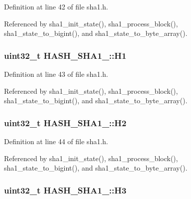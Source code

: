 Definition at line 42 of file sha1.\-h.



Referenced by sha1\-\_\-init\-\_\-state(), sha1\-\_\-process\-\_\-block(), sha1\-\_\-state\-\_\-to\-\_\-bigint(), and sha1\-\_\-state\-\_\-to\-\_\-byte\-\_\-array().

\hypertarget{structHASH__SHA1___a2545254302e2eb1e28e94f43cee5ac98}{
\subsubsection[{H1}]{\setlength{\rightskip}{0pt plus 5cm}uint32\-\_\-t H\-A\-S\-H\-\_\-\-S\-H\-A1\-\_\-\-::\-H1}}\label{structHASH__SHA1___a2545254302e2eb1e28e94f43cee5ac98}


Definition at line 43 of file sha1.\-h.



Referenced by sha1\-\_\-init\-\_\-state(), sha1\-\_\-process\-\_\-block(), sha1\-\_\-state\-\_\-to\-\_\-bigint(), and sha1\-\_\-state\-\_\-to\-\_\-byte\-\_\-array().

\hypertarget{structHASH__SHA1___a889fdb5090b3b3d0a823f4f951e32b6c}{
\subsubsection[{H2}]{\setlength{\rightskip}{0pt plus 5cm}uint32\-\_\-t H\-A\-S\-H\-\_\-\-S\-H\-A1\-\_\-\-::\-H2}}\label{structHASH__SHA1___a889fdb5090b3b3d0a823f4f951e32b6c}


Definition at line 44 of file sha1.\-h.



Referenced by sha1\-\_\-init\-\_\-state(), sha1\-\_\-process\-\_\-block(), sha1\-\_\-state\-\_\-to\-\_\-bigint(), and sha1\-\_\-state\-\_\-to\-\_\-byte\-\_\-array().

\hypertarget{structHASH__SHA1___a453afc35ccc047109080a44ba41d1a66}{
\subsubsection[{H3}]{\setlength{\rightskip}{0pt plus 5cm}uint32\-\_\-t H\-A\-S\-H\-\_\-\-S\-H\-A1\-\_\-\-::\-H3}}\label{structHASH__SHA1___a453afc35ccc047109080a44ba41d1a66}


